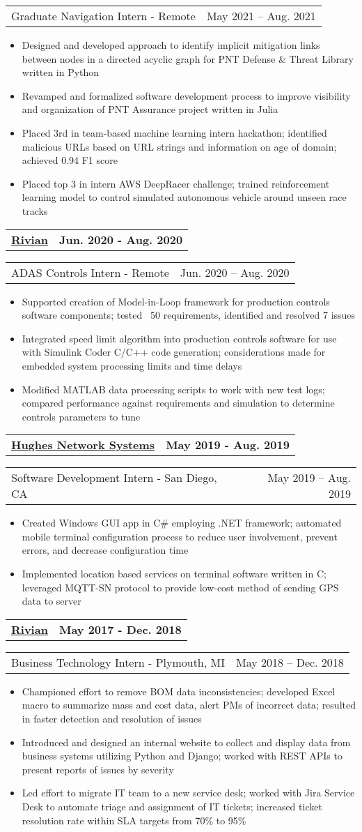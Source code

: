 \documentclass[letterpaper,11pt]{article}
\makeatletter
\newcommand{\resumeItem}[1]{
	\item\small{
		#1
	}
}
\newcommand{\resumeCompanyHeading}[2]{
  \vspace{-1pt}\item
    \begin{tabular*}{0.97\textwidth}[t]{l@{\extracolsep{\fill}}r}
      \textbf{#1} & \textbf{#2} \\
    \end{tabular*}\vspace{-0pt}
}
\newcommand{\resumeJobHeading}[3]{
	\vspace{-1pt}
	\begin{tabular*}{0.97\textwidth}[t]{l@{\extracolsep{\fill}}r}
		{\small#1} - {\small #2} & {\small #3} \\
	\end{tabular*}\vspace{-4pt}
}
\newcommand{\resumeItemListStart}{\begin{itemize}}
\newcommand{\resumeItemListEnd}{\end{itemize}\vspace{-4pt}}
\makeatother
\begin{document}
    \resumeJobHeading{Graduate Navigation Intern}{Remote}{May 2021 -- Aug. 2021}
    \resumeItemListStart
      \resumeItem{Designed and developed approach to identify implicit mitigation links between nodes in a directed acyclic graph for PNT Defense \& Threat Library written in Python}
      \resumeItem{Revamped and formalized software development process to improve visibility and organization of PNT Assurance project written in Julia}
      \resumeItem{Placed 3rd in team-based machine learning intern hackathon; identified malicious URLs based on URL strings and information on age of domain; achieved 0.94 F1 score}
      \resumeItem{Placed top 3 in intern AWS DeepRacer challenge; trained reinforcement learning model to control simulated autonomous vehicle around unseen race tracks}
    \resumeItemListEnd

  \resumeCompanyHeading{\href{https://rivian.com/}{Rivian}}{Jun. 2020 - Aug. 2020}
    \resumeJobHeading{ADAS Controls Intern}{Remote}{Jun. 2020 -- Aug. 2020}
    \resumeItemListStart
      \resumeItem{Supported creation of Model-in-Loop framework for production controls software components; tested ~50 requirements, identified and resolved 7 issues}
      \resumeItem{Integrated speed limit algorithm into production controls software for use with Simulink Coder C/C++ code generation; considerations made for embedded system processing limits and time delays}
      \resumeItem{Modified MATLAB data processing scripts to work with new test logs; compared performance against requirements and simulation to determine controls parameters to tune}
    \resumeItemListEnd

  \resumeCompanyHeading{\href{https://www.hughes.com/}{Hughes Network Systems}}{May 2019 - Aug. 2019}
    \resumeJobHeading{Software Development Intern}{San Diego, CA}{May 2019 -- Aug. 2019}
    \resumeItemListStart
      \resumeItem{Created Windows GUI app in C\# employing .NET framework; automated mobile terminal configuration process to reduce user involvement, prevent errors, and decrease configuration time}
      \resumeItem{Implemented location based services on terminal software written in C; leveraged MQTT-SN protocol to provide low-cost method of sending GPS data to server}
    \resumeItemListEnd

  \resumeCompanyHeading{\href{https://rivian.com/}{Rivian}}{May 2017 - Dec. 2018}
    \resumeJobHeading{Business Technology Intern}{Plymouth, MI}{May 2018 -- Dec. 2018}
    \resumeItemListStart
      \resumeItem{Championed effort to remove BOM data inconsistencies; developed Excel macro to summarize mass and cost data, alert PMs of incorrect data; resulted in faster detection and resolution of issues}
      \resumeItem{Introduced and designed an internal website to collect and display data from business systems utilizing Python and Django; worked with REST APIs to present reports of issues by severity}
      \resumeItem{Led effort to migrate IT team to a new service desk; worked with Jira Service Desk to automate triage and assignment of IT tickets; increased ticket resolution rate within SLA targets from 70\% to 95\%}
    \resumeItemListEnd
\end{document}
